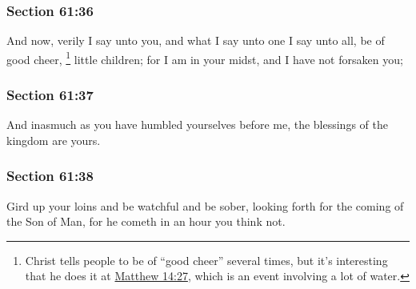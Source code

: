 	\subsubsection{Section 61:36} %
		\label{DC61-36}

		And now, verily I say unto you, and what I say unto one I say unto all, be of good cheer,%
			\footnote{%
				Christ tells people to be of ``good cheer'' several times, but it's interesting that he does it at \hyperref[MATTHEW-14-27]{Matthew 14:27}, which is an event involving a lot of water.
				}
		little children; for I am in your midst, and I have not forsaken you;


	\subsubsection{Section 61:37} %
		\label{DC61-37}

		And inasmuch as you have humbled yourselves before me, the blessings of the kingdom are yours.


	\subsubsection{Section 61:38} %
		\label{DC61-38}

		Gird up your loins and be watchful and be sober, looking forth for the coming of the Son of Man, for he cometh in an hour you think not.


